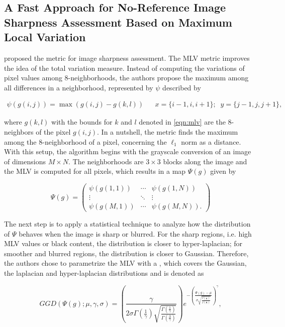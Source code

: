 \subsection{A Fast Approach for No-Reference Image Sharpness Assessment Based on Maximum Local Variation}

 proposed the  metric for image sharpness assessment. The MLV metric improves the idea of the total variation measure. Instead of computing the variations of pixel values among 8-neighborhoods, the authors propose the maximum among all differences in a neighborhood, represented by $\psi$ described by

\begin{align}
\label{eqn:mlv}
\psi(g(i,j)) = \max(g(i,j) - g(k,l))
&&
x = \{i - 1, i, i + 1\};\;\;
y = \{j - 1, j, j + 1\},
\end{align}

\noindent where $g(k,l)$ with the bounds for $k$ and $l$ denoted in \autoref{eqn:mlv} are the 8-neighbors of the pixel $g(i,j)$. In a nutshell, the metric finds the maximum among the 8-neighborhood of a pixel, concerning the $\ell_{1}$ norm as a distance. With this setup, the algorithm begins with the grayscale conversion of an image of dimensions $M \times N$. The neighborhoods are $3 \times 3$ blocks along the image and the MLV is computed for all pixels, which results in a map $\Psi(g)$ given by

\begin{equation}
\label{eqn:mlv_matrix}
\Psi(g) =
    \begin{pmatrix}
        \psi(g(1,1)) & \cdots &  \psi(g(1,N))\\
        \vdots & \ddots & \vdots\\
        \psi(g(M,1)) & \cdots & \psi(g(M,N)).
    \end{pmatrix}
\end{equation}

\noindent The next step is to apply a statistical technique to analyze how the distribution of $\Psi$ behaves when the image is sharp or blurred. For the sharp regions, i.e. high MLV values or black content, the distribution is closer to hyper-laplacian; for smoother and blurred regions, the distribution is closer to Gaussian. Therefore, the authors chose to parametrize the MLV with a , which covers the Gaussian, the laplacian and hyper-laplacian distributions and is denoted as

\begin{equation}
\label{eqn:GGD_distribution}
GGD(\Psi(g); \mu, \gamma, \sigma) =
\left(
    \frac{\gamma}{2 \sigma \Gamma \left( \frac{1}{\gamma} \right) \sqrt{\frac{\Gamma \left( \frac{1}{\gamma} \right)}{\Gamma \left( \frac{3}{\gamma} \right)}}}
\right)
e^{- \left(
        \frac{\Psi(g) - \mu}{\sigma \sqrt{\frac{\Gamma \left( \frac{1}{\gamma} \right)}{\Gamma \left( \frac{3}{\gamma} \right)}}}
    \right)^{\gamma}},
\end{equation}

